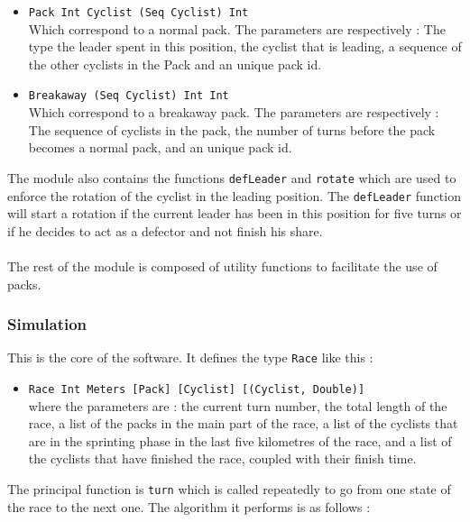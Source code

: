 \documentclass[10pt, a4paper]{report}
\begin{document}
\begin{itemize}
\item \texttt{Pack Int Cyclist (Seq Cyclist) Int} \\ Which correspond to a normal pack. The parameters are respectively : The type the leader spent in this position, the cyclist that is leading, a sequence of the other cyclists in the Pack and an unique pack id.
\item \texttt{Breakaway (Seq Cyclist) Int Int} \\ Which correspond to a breakaway pack. The parameters are respectively : The sequence of cyclists in the pack, the number of turns before the pack becomes a normal pack, and an unique pack id.
\end{itemize}
The module also contains the functions \texttt{defLeader} and \texttt{rotate} which are used to enforce the rotation of the cyclist in the leading position. The \texttt{defLeader} function will start a rotation if the current leader has been in this position for five turns or if he decides to act as a defector and not finish his share. \\\\
The rest of the module is composed of utility functions to facilitate the use of packs.

\subsubsection{Simulation}
This is the core of the software. It defines the type \texttt{Race} like this :
\begin{itemize}
\item \texttt{Race Int Meters [Pack] [Cyclist] [(Cyclist, Double)]} \\ where the parameters are : the current turn number, the total length of the race, a list of the packs in the main part of the race, a list of the cyclists that are in the sprinting phase in the last five kilometres of the race, and a list of the cyclists that have finished the race, coupled with their finish time.
\end{itemize}
The principal function is \texttt{turn} which is called repeatedly to go from one state of the race to the next one. The algorithm it performs is as follows :
\end{document}

